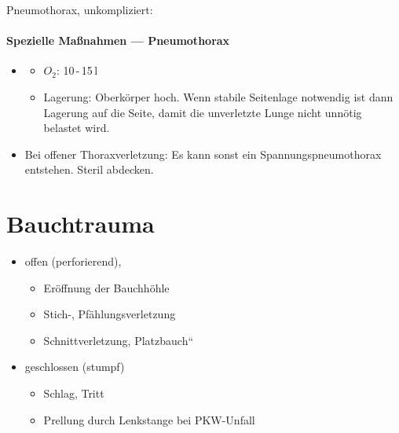 Pneumothorax, unkompliziert:

\begin{gMassnahmenEnv}
    \paragraph{Spezielle Maßnahmen --- Pneumothorax}
    \begin{itemize}
        \item \gTxMassVitBes
        \begin{itemize}
            \item $O_2$: 10\,-\,15\,l
            \item Lagerung: Oberkörper hoch. Wenn stabile
            Seitenlage notwendig ist dann Lagerung auf die
             Seite, damit die unverletzte
            Lunge  nicht unnötig belastet wird.
        \end{itemize}
        \item Bei offener Thoraxverletzung:  Es kann sonst ein
        Spannungspneumothorax entstehen. Steril abdecken. 
    \end{itemize}
\end{gMassnahmenEnv}



\section{Bauchtrauma}

\begin{itemize}
    \item offen (perforierend),
    \begin{itemize}
        \item  Er\"offnung der  Bauchh\"ohle
        \item Stich-, Pf\"ahlungsverletzung
        \item Schnittverletzung, {\quotedblbase}Platzbauch{\textquotedblleft}
    \end{itemize}
    \item geschlossen (stumpf)
    \begin{itemize}
        \item Schlag, Tritt
        \item Prellung durch Lenkstange bei PKW-Unfall
    \end{itemize}
\end{itemize}




